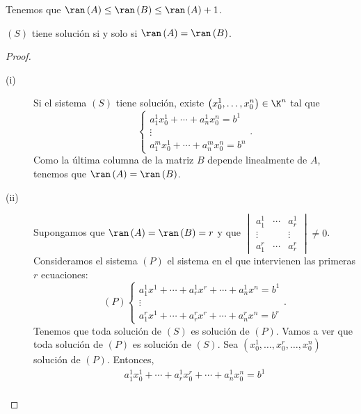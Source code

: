 Tenemos que $\displaystyle \ran\left(A\right) \leq \ran\left(B\right) \leq \ran\left(A\right) + 1 $.
\begin{ftheorem}
\normalfont $\displaystyle \left(S\right) $ tiene solución si y solo si $\displaystyle \ran\left(A\right) = \ran\left(B\right) $.
\end{ftheorem}
\begin{proof}
\begin{description}
\item[(i)] Si el sistema $\displaystyle \left(S\right) $ tiene solución, existe $\displaystyle \left(x^{1}_{0}, \ldots, x^{n}_{0}\right) \in \K^{n} $ tal que 
	\[
	\begin{cases}
	a^{1}_{1}x^{1}_{0} + \cdots + a^{1}_{n}x^{n}_{0} = b^{1} \\
	\vdots \\
	a^{m}_{1}x^{1}_{0}+\cdots + a^{m}_{n}x^{n}_{0} = b^{n}
	\end{cases}
	.\]
Como la última columna de la matriz $\displaystyle B $ depende linealmente de $\displaystyle A $, tenemos que $\displaystyle \ran\left(A\right) = \ran\left(B\right) $.
\item[(ii)] Supongamos que $\displaystyle \ran\left(A\right) = \ran\left(B\right) = r $ y que $\displaystyle \begin{vmatrix} a^{1}_{1} & \cdots & a^{1}_{r} \\
	\vdots & & \vdots \\
a^{r}_{1} & \cdots & a^{r}_{r}\end{vmatrix} \neq 0 $. Consideramos el sistema $\displaystyle \left(P\right) $ el sistema en el que intervienen las primeras $\displaystyle r $ ecuaciones:
\[\left(P\right)
\begin{cases}
a^{1}_{1}x^{1} + \cdots + a^{1}_{r}x^{r} + \cdots + a^{1}_{n}x^{n} = b^{1} \\ 
\vdots \\
a^{r}_{1}x^{1} + \cdots + a^{r}_{r}x^{r} + \cdots + a^{r}_{n}x^{n} = b^{r}
\end{cases}
.\]
Tenemos que toda solución de $\displaystyle \left(S\right) $ es solución de $\displaystyle \left(P\right) $. Vamos a ver que toda solución de $\displaystyle \left(P\right) $ es solución de $\displaystyle \left(S\right) $. Sea $\displaystyle \left(x^{1}_{0}, \ldots, x^{r}_{0}, \ldots, x^{n}_{0}\right) $ solución de $\displaystyle \left(P\right) $. Entonces,
\[\begin{split}
	a^{1}_{1} x^{1}_{0} + \cdots + a^{1}_{r}x^{r}_{0} + \cdots + a^{1}_{n}x^{n}_{0} = b^{1} \\

\end{split}\]
\end{description}
\end{proof}

